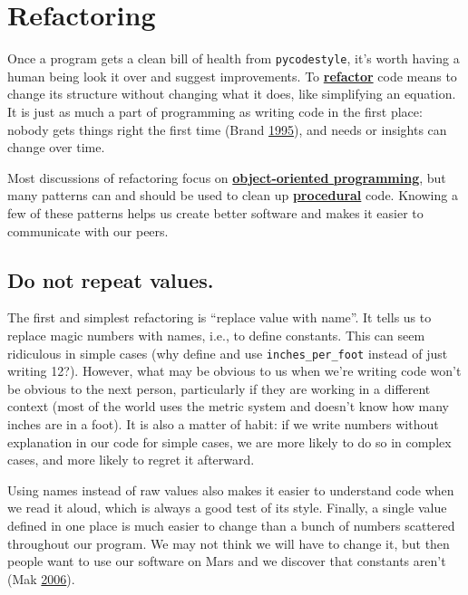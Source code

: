 \documentclass[
]{krantz}
\newcommand{\gref}[2]{\hyperlink{#2}{\textbf{#1}}}
\begin{document}
\hypertarget{style-refactor}{%
\section{Refactoring}\label{style-refactor}}

Once a program gets a clean bill of health from \texttt{pycodestyle},
it's worth having a human being look it over and suggest improvements.
To \gref{refactor}{refactoring} code
means to change its structure without changing what it does,
like simplifying an equation.
It is just as much a part of programming as writing code in the first place:
nobody gets things right the first time (Brand \protect\hyperlink{ref-Bran1995}{1995}),
and needs or insights can change over time.

Most discussions of refactoring focus on \gref{object-oriented programming}{oop},
but many patterns can and should be used to clean up \gref{procedural}{procedural\_programming} code.
Knowing a few of these patterns helps us create better software
and makes it easier to communicate with our peers.

\hypertarget{do-not-repeat-values.}{%
\subsection{Do not repeat values.}\label{do-not-repeat-values.}}

The first and simplest refactoring is ``replace value with name''.
It tells us to replace magic numbers with names,
i.e., to define constants.
This can seem ridiculous in simple cases
(why define and use \texttt{inches\_per\_foot} instead of just writing 12?).
However,
what may be obvious to us when we're writing code won't be obvious to the next person,
particularly if they are working in a different context
(most of the world uses the metric system and doesn't know how many inches are in a foot).
It is also a matter of habit:
if we write numbers without explanation in our code for simple cases,
we are more likely to do so in complex cases,
and more likely to regret it afterward.

Using names instead of raw values also makes it easier to understand code when we read it aloud,
which is always a good test of its style.
Finally,
a single value defined in one place is much easier to change
than a bunch of numbers scattered throughout our program.
We may not think we will have to change it,
but then people want to use our software on Mars and we discover that constants aren't (Mak \protect\hyperlink{ref-Mak2006}{2006}).
\end{document}
